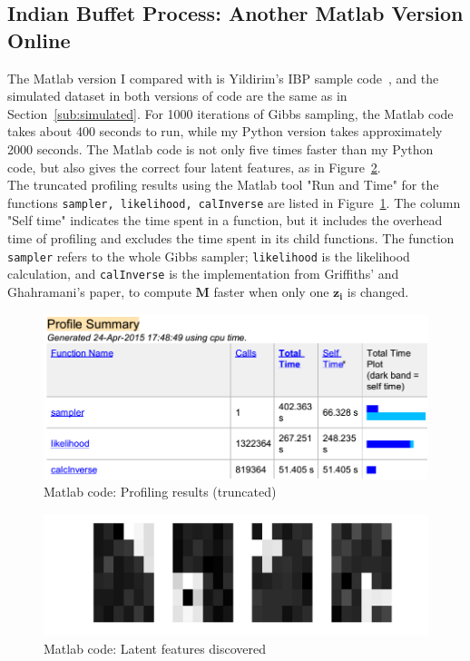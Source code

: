 \subsection{Indian Buffet Process: Another Matlab Version Online}

The Matlab version I compared with is Yildirim's IBP sample code~\cite{ibp2012code}, and the simulated dataset in both versions of code are the same as in Section~\ref{sub:simulated}. For 1000 iterations of Gibbs sampling, the Matlab code takes about 400 seconds to run, while my Python version takes approximately 2000 seconds. The Matlab code is not only five times faster than my Python code, but also gives the correct four latent features, as in Figure~\ref{fig:matlabresults}.\\

The truncated profiling results using the Matlab tool "Run and Time" for the functions \texttt{sampler, likelihood, calInverse} are listed in Figure~\ref{fig:ibp2012matlab}. The column "Self time" indicates the time spent in a function, but it includes the overhead time of profiling and excludes the time spent in its child functions. The function \texttt{sampler} refers to the whole Gibbs sampler; \texttt{likelihood} is the likelihood calculation, and \texttt{calInverse} is the implementation from Griffiths' and Ghahramani's paper\cite{griffiths2005detailed}, to compute $\mathbf{M}$ faster when only one $\mathbf{z_i}$ is changed. 

\begin{figure}[!ht]
\centering
    \includegraphics[width=0.8\linewidth]{IBP_MATLABcode/matlab_code_profiling_summary.png}
    \caption{Matlab code: Profiling results (truncated)}
    \label{fig:ibp2012matlab}
\end{figure}

\begin{figure}[!ht]
\centering
    \includegraphics[width=0.8\linewidth]{IBP_MATLABcode/Fig4_results.png}
    \caption{Matlab code: Latent features discovered}
    \label{fig:matlabresults}
\end{figure}

